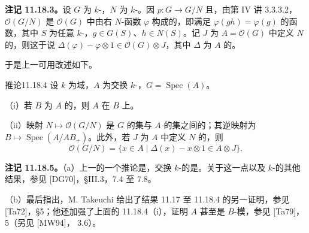 \textbf{注记 11.18.3。}设 $G$ 为 $k$-，$N$ 为 $k$-。因 $p:G\to G/N$ 且，由第 IV 讲 3.3.3.2，$\mathcal O(G/N)$ 是 $\mathcal O(G)$ 中由右 $N$-函数 $\varphi$ 构成的，即满足 $\varphi(gh)=\varphi(g)$ 的函数，其中 $S$ 为任意 $k$-，$g\in G(S)$、$h\in N(S)$。记 $J$ 为 $A=\mathcal O(G)$ 中定义 $N$ 的，则这于说 $\Delta(\varphi)-\varphi\otimes1\in\mathcal O(G)\otimes J$，其中 $\Delta$ 为 $A$ 的。

于是上一可用改述如下。
\begin{SGAresult}{推论}{11.18.4}
设 $k$ 为域，$A$ 为交换 $k$-，$G=\operatorname{Spec}(A)$。

（i）若 $B$ 为 $A$ 的，则 $A$ 在 $B$ 上。

（ii）映射 $N\mapsto\mathcal O(G/N)$ 是 $G$ 的集与 $A$ 的集之间的；其逆映射为 $B\mapsto\operatorname{Spec}(A/AB_+)$。此外，若 $J$ 为 $A$ 中定义 $N$ 的，则
\[
\mathcal O(G/N)=\{x\in A\mid\Delta(x)-x\otimes1\in A\otimes J\}.
\]
\end{SGAresult}

\textbf{注记 11.18.5。}（a）上一的一个推论是，交换 $k$-的是。关于这一点以及 $k$-的其他结果，参见 [DG70]，§III.3，7.4 至 7.8。

（b）最后指出，M. Takeuchi 给出了结果 11.17 至 11.18.4 的另一证明，参见 [Ta72]，§5；他还加强了上面的 11.18.4（i），证明 $A$ 甚至是 $B$-模，参见 [Ta79]， 5（另见 [MW94]， 3.6）。

